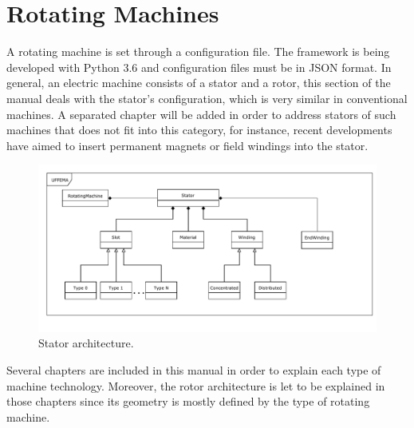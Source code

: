 \documentclass[justified]{tufte-book} %
\begin{document}
\chapter{Rotating Machines}
\label{ch:rotating_machines}
\begin{fullwidth}
A rotating machine is set through a configuration file. The framework is being developed with Python 3.6 and configuration files must be in JSON format. In general, an electric machine consists of a stator and a rotor, this section of the manual deals with the stator's configuration, which is very similar in conventional machines. A separated chapter will be added in order to address stators of such machines that does not fit into this category, for instance, recent developments have aimed to insert permanent magnets or field windings into the stator. 
\end{fullwidth}
\begin{figure}[h]
\includegraphics[width=\linewidth]{Stator.pdf}
\caption{Stator architecture.}
\label{fig:stator}
\end{figure}

Several chapters are included in this manual in order to explain each type of machine technology. Moreover, the rotor architecture is let to be explained in those chapters since its geometry is mostly defined by the type of rotating machine. 
\end{document}
